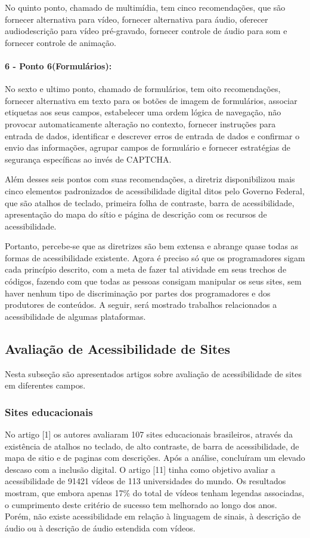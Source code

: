 \documentclass[a4paper]{article}
\begin{document}
\begin{titlepage}
No quinto ponto, chamado de multimídia, tem cinco recomendações, que são fornecer alternativa para vídeo, fornecer alternativa para áudio, oferecer audiodescrição para vídeo pré-gravado, fornecer controle de áudio para som e fornecer controle de animação.

\paragraph{6 - Ponto 6(Formulários): }

No sexto e ultimo ponto, chamado de formulários, tem oito recomendações, fornecer alternativa em texto para os botões de imagem de formulários, associar etiquetas aos seus campos, estabelecer uma ordem lógica de navegação, não provocar automaticamente alteração no contexto, fornecer instruções para entrada de dados, identificar e descrever erros de entrada de dados e confirmar o envio das informações, agrupar campos de formulário e fornecer estratégias de segurança específicas ao invés de CAPTCHA.

Além desses seis pontos com suas recomendações, a diretriz disponibilizou mais cinco elementos padronizados de acessibilidade digital ditos pelo Governo Federal, que são atalhos de teclado, primeira folha de contraste, barra de acessibilidade, apresentação do mapa do sítio e página de descrição com os recursos de acessibilidade.

Portanto, percebe-se que as diretrizes são bem extensa e abrange quase todas as formas de acessibilidade existente. Agora é preciso só que os programadores sigam cada princípio descrito, com a meta de fazer tal atividade em seus trechos de códigos, fazendo com que todas as pessoas consigam manipular os seus sites, sem haver nenhum tipo de discriminação por partes dos programadores e dos produtores de conteúdos. A seguir, será mostrado trabalhos relacionados a acessibilidade de algumas plataformas.

\subsection{Avaliação de Acessibilidade de Sites}
Nesta subseção são apresentados artigos sobre avaliação de acessibilidade de sites em diferentes campos.

\subsubsection{Sites educacionais}

No artigo [1] os autores avaliaram 107 sites educacionais brasileiros, através da existência de atalhos no teclado, de alto contraste, de barra de acessibilidade, de mapa de sitio e de paginas com descrições. Após a análise, concluíram um elevado descaso com a inclusão digital. O artigo [11] tinha como objetivo avaliar a acessibilidade de 91421 vídeos de 113 universidades do mundo. Os resultados mostram, que embora apenas 17\% do total de vídeos tenham legendas associadas, o cumprimento deste critério de sucesso tem melhorado ao longo dos anos. Porém, não existe acessibilidade em relação à linguagem de sinais, à descrição de áudio ou à descrição de áudio estendida com vídeos.


\end{titlepage}
\end{document}
